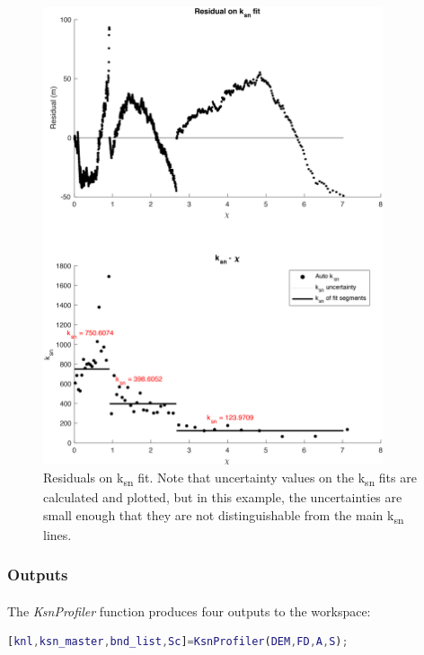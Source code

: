 \begin{figure}[H]
	\centering
	\includegraphics[width=10cm]{PNGs/B92_StreamRsds_9.png}
	\caption{Residuals on k\textsubscript{sn} fit. Note that uncertainty values on the k\textsubscript{sn} fits are calculated and plotted, but in this example, the uncertainties are small enough that they are not distinguishable from the main k\textsubscript{sn} lines.} 
	\label{fig:ProfilerRes}
\end{figure}

\subsubsection{Outputs}
\paragraph{}The \textit{KsnProfiler} function produces four outputs to the workspace:

\begin{lstlisting}[language=Matlab]
[knl,ksn_master,bnd_list,Sc]=KsnProfiler(DEM,FD,A,S);
\end{lstlisting}

